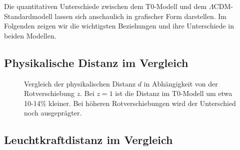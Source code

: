 \documentclass[a4paper,12pt]{article}
\theoremstyle{definition}
\theoremstyle{remark}
\begin{document}
	Die quantitativen Unterschiede zwischen dem T0-Modell und dem $\Lambda$CDM-Standardmodell lassen sich anschaulich in grafischer Form darstellen. Im Folgenden zeigen wir die wichtigsten Beziehungen und ihre Unterschiede in beiden Modellen.
	
	\subsection{Physikalische Distanz im Vergleich}
	
	\begin{figure}[H]
		\centering
		\caption{Vergleich der physikalischen Distanz $d$ in Abhängigkeit von der Rotverschiebung $z$. Bei $z=1$ ist die Distanz im T0-Modell um etwa 10-14\% kleiner. Bei höheren Rotverschiebungen wird der Unterschied noch ausgeprägter.}
		\label{fig:phys_distance}
	\end{figure}
	
	\subsection{Leuchtkraftdistanz im Vergleich}
	
\end{document}
